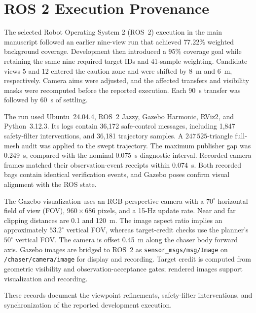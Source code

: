 \documentclass{IEEEtaes}
\begin{document}
\section{ROS 2 Execution Provenance}

The selected Robot Operating System 2 (ROS~2) execution in the main manuscript followed an earlier nine-view run that achieved 77.22\% weighted background coverage. Development then introduced a 95\% coverage goal while retaining the same nine required target IDs and 41-sample weighting. Candidate views 5 and 12 entered the caution zone and were shifted by 8~m and 6~m, respectively. Camera aims were adjusted, and the affected transfers and visibility masks were recomputed before the reported execution. Each 90~s transfer was followed by 60~s of settling.

The run used Ubuntu~24.04.4, ROS~2 Jazzy, Gazebo Harmonic, RViz2, and Python~3.12.3. Its logs contain 36,172 safe-control messages, including 1,847 safety-filter interventions, and 36,181 trajectory samples. A $247\,525$-triangle full-mesh audit was applied to the swept trajectory. The maximum publisher gap was 0.249~s, compared with the nominal 0.075~s diagnostic interval. Recorded camera frames matched their observation-event receipts within 0.074~s. Both recorded bags contain identical verification events, and Gazebo poses confirm visual alignment with the ROS state.

The Gazebo visualization uses an RGB perspective camera with a $70^{\circ}$ horizontal field of view (FOV), $960\times686$ pixels, and a 15-Hz update rate. Near and far clipping distances are 0.1 and 120~m. The image aspect ratio implies an approximately $53.2^{\circ}$ vertical FOV, whereas target-credit checks use the planner's $50^{\circ}$ vertical FOV. The camera is offset 0.45~m along the chaser body forward axis. Gazebo images are bridged to ROS~2 as \texttt{sensor\_msgs/msg/Image} on \texttt{/chaser/camera/image} for display and recording. Target credit is computed from geometric visibility and observation-acceptance gates; rendered images support visualization and recording.

These records document the viewpoint refinements, safety-filter interventions, and synchronization of the reported development execution.
\end{document}
